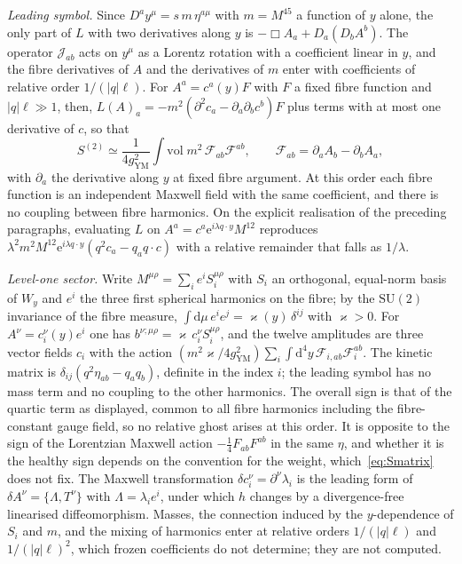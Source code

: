 \emph{Leading symbol.} Since \(D^ay^\mu=s\,m\,\eta^{a\mu}\) with \(m=M^{45}\) a function of \(y\) alone, the only part of \(L\) with two derivatives along \(y\) is \(-\Box A_a+D_a(D_bA^b)\). The operator \(\mathcal J_{ab}\) acts on \(y^\mu\) as a Lorentz rotation with a coefficient linear in \(y\), and the fibre derivatives of \(A\) and the derivatives of \(m\) enter with coefficients of relative order \(1/(|q|\ell)\). For \(A^a=c^a(y)F\) with \(F\) a fixed fibre function and \(|q|\ell\gg1\), then, \(L(A)_a=-m^2(\partial^2c_a-\partial_a\partial_bc^b)F\) plus terms with at most one derivative of \(c\), so that
\[
S^{(2)}\simeq\frac{1}{4g_{\mathrm{YM}}^2}\int\mathrm{vol}\;m^2\,\mathcal F_{ab}\mathcal F^{ab},\qquad
\mathcal F_{ab}=\partial_aA_b-\partial_bA_a ,
\]
with \(\partial_a\) the derivative along \(y\) at fixed fibre argument. At this order each fibre function is an independent Maxwell field with the same coefficient, and there is no coupling between fibre harmonics. On the explicit realisation of the preceding paragraphs, evaluating \(L\) on \(A^a=c^a\mathrm e^{i\lambda q\cdot y}M^{12}\) reproduces \(\lambda^2m^2M^{12}\mathrm e^{i\lambda q\cdot y}(q^2c_a-q_aq\cdot c)\) with a relative remainder that falls as \(1/\lambda\).

\emph{Level-one sector.} Write \(M^{\mu\rho}=\sum_ie^iS_i^{\mu\rho}\) with \(S_i\) an orthogonal, equal-norm basis of \(W_y\) and \(e^i\) the three first spherical harmonics on the fibre; by the \(\mathrm{SU}(2)\) invariance of the fibre measure, \(\int\mathrm d\mu\,e^ie^j=\varkappa(y)\,\delta^{ij}\) with \(\varkappa>0\). For \(A^\nu=c^\nu_i(y)e^i\) one has \(b^{\nu;\mu\rho}=\varkappa\,c^\nu_iS_i^{\mu\rho}\), and the twelve amplitudes are three vector fields \(c_i\) with the action \((m^2\varkappa/4g_{\mathrm{YM}}^2)\sum_i\int\mathrm d^4y\,\mathcal F_{i,ab}\mathcal F_i^{ab}\). The kinetic matrix is \(\delta_{ij}(q^2\eta_{ab}-q_aq_b)\), definite in the index \(i\); the leading symbol has no mass term and no coupling to the other harmonics. The overall sign is that of the quartic term as displayed, common to all fibre harmonics including the fibre-constant gauge field, so no relative ghost arises at this order. It is opposite to the sign of the Lorentzian Maxwell action \(-\tfrac14F_{ab}F^{ab}\) in the same \(\eta\), and whether it is the healthy sign depends on the convention for the weight, which~\eqref{eq:Smatrix} does not fix. The Maxwell transformation \(\delta c_i^\nu=\partial^\nu\lambda_i\) is the leading form of \(\delta A^\nu=\{\Lambda,T^\nu\}\) with \(\Lambda=\lambda_ie^i\), under which \(h\) changes by a divergence-free linearised diffeomorphism. Masses, the connection induced by the \(y\)-dependence of \(S_i\) and \(m\), and the mixing of harmonics enter at relative orders \(1/(|q|\ell)\) and \(1/(|q|\ell)^2\), which frozen coefficients do not determine; they are not computed.


